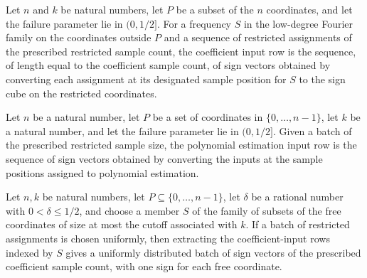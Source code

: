 \begin{definition}
\label{FABL.lowDegreeJuntaCoefficientInputRow}
\leanok
{}
Let $n$ and $k$ be natural numbers, let $P$ be a subset of the $n$ coordinates, and let
the failure parameter lie in $(0,1/2]$. For a frequency $S$ in the low-degree Fourier
family on the coordinates outside $P$ and a sequence of restricted assignments of the
prescribed restricted sample count, the coefficient input row is the sequence, of length
equal to the coefficient sample count, of sign vectors obtained by converting each
assignment at its designated sample position for $S$ to the sign cube on the restricted
coordinates.
\end{definition}

\begin{definition}
\label{FABL.lowDegreeJuntaPolynomialInputRow}
\leanok
{}
Let $n$ be a natural number, let $P$ be a set of coordinates in $\{0,\ldots,n-1\}$, let
$k$ be a natural number, and let the failure parameter lie in $(0,1/2]$. Given a batch
of the prescribed restricted sample size, the polynomial estimation input row is the
sequence of sign vectors obtained by converting the inputs at the sample positions
assigned to polynomial estimation.
\end{definition}

\begin{theorem}
\label{FABL.map_uniformPMF_lowDegreeJuntaCoefficientInputRow}
\leanok
{}
Let $n,k$ be natural numbers, let $P\subseteq\{0,\ldots,n-1\}$, let $\delta$ be a
rational number with $0<\delta\leq 1/2$, and choose a member $S$ of the family of
subsets of the free coordinates of size at most the cutoff associated with $k$. If a
batch of restricted assignments is chosen uniformly, then extracting the
coefficient-input rows indexed by $S$ gives a uniformly distributed batch of sign
vectors of the prescribed coefficient sample count, with one sign for each free
coordinate.
\end{theorem}

